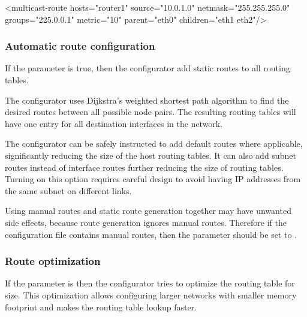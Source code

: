 \begin{XML}
<multicast-route hosts="router1" source="10.0.1.0" netmask="255.255.255.0"
                 groups="225.0.0.1" metric="10"
                 parent="eth0" children="eth1 eth2"/>
\end{XML}

\subsubsection*{Automatic route configuration}

If the  parameter is true, then
the configurator add static routes to all routing tables.

The configurator uses Dijkstra's weighted shortest path algorithm to find
the desired routes between all possible node pairs. The resulting
routing tables will have one entry for all destination interfaces in the
network.


The configurator can be safely instructed to add default routes
where applicable, significantly reducing the size of the host routing
tables. It can also add subnet routes instead of interface routes further
reducing the size of routing tables. Turning on this option requires
careful design to avoid having IP addresses from the same subnet on
different links.


\begin{caution}
Using manual routes and static route generation
together may have unwanted side effects, because route generation ignores
manual routes. Therefore if the configuration file contains
manual routes, then the  parameter should be set
to .
\end{caution}

\subsubsection*{Route optimization}

If the  parameter is  then the
configurator tries to optimize the routing table for size.
This optimization allows configuring larger networks with smaller
memory footprint and makes the routing table lookup faster.

